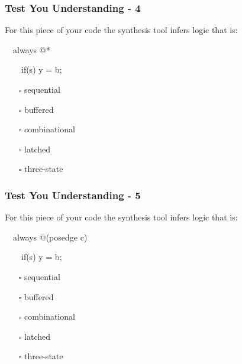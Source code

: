 \documentclass[t, notes, xcolor=table]{beamer}
\begin{document}
\begin{frame}
\frametitle{Test You Understanding - 4}
For this piece of your code the synthesis tool infers logic that is:

\ \ always @*
  
\ \ \ \ if(s) y = b;

\begin{itemize}
\item[$\square$] sequential
\item[$\square$] buffered
\item[$\square$] combinational
\item[$\square$] latched
\item[$\square$] three-state
\end{itemize}
\end{frame}
\begin{frame}
\frametitle{Test You Understanding - 5}
For this piece of your code the synthesis tool infers logic that is:

\ \ always @(posedge c)
  
\ \ \ \ if(s) y = b;

\begin{itemize}
\item[$\square$] sequential
\item[$\square$] buffered
\item[$\square$] combinational
\item[$\square$] latched
\item[$\square$] three-state
\end{itemize}
\end{frame}
\end{document}
